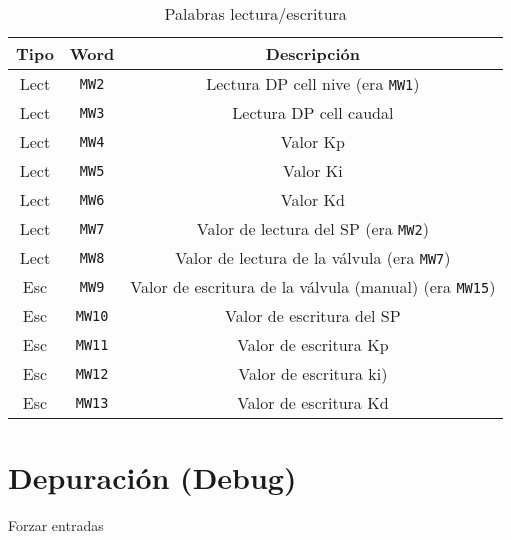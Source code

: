 \begin{table}[!t]

\renewcommand{\arraystretch}{1.3}
\centering
\begin{tabular}{c||c||c}
\hline
\bfseries Tipo & \bfseries Word  & \bfseries Descripción\\
\hline \hline
Lect & \verb|MW2|  & Lectura DP cell nive (era \verb|MW1|)\\
Lect & \verb|MW3|  & Lectura DP cell caudal\\
Lect & \verb|MW4|  & Valor Kp\\
Lect & \verb|MW5|  & Valor Ki\\
Lect & \verb|MW6|  & Valor Kd\\
Lect & \verb|MW7|  & Valor de lectura del SP (era \verb|MW2|)\\
Lect & \verb|MW8|  & Valor de lectura de la válvula (era \verb|MW7|)\\
\hline
Esc & \verb|MW9| & Valor de escritura de la válvula (manual) (era 
\verb|MW15|) \\
Esc & \verb|MW10|  & Valor de escritura del SP \\
Esc & \verb|MW11|  & Valor de escritura Kp \\
Esc & \verb|MW12|  & Valor de escritura ki) \\
Esc & \verb|MW13| & Valor de escritura Kd \\
\hline
\end{tabular}
\caption{Palabras lectura/escritura}
\end{table}

\section{Depuración (Debug)}
\label{sec:Debug}
Forzar entradas
